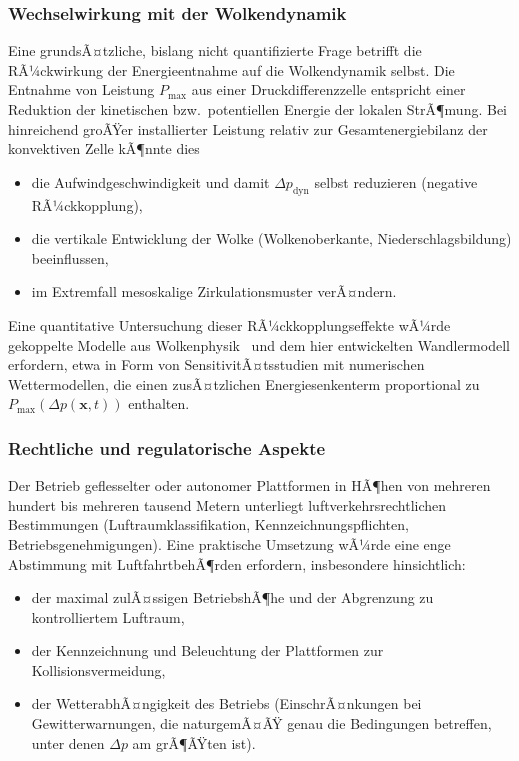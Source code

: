 ﻿\documentclass[a4paper,12pt]{article}
\theoremstyle{definition}
\begin{document}
\subsubsection{Wechselwirkung mit der Wolkendynamik}

Eine grundsÃ¤tzliche, bislang nicht quantifizierte Frage betrifft die
RÃ¼ckwirkung der Energieentnahme auf die Wolkendynamik selbst. Die
Entnahme von Leistung $P_{\max}$ aus einer Druckdifferenzzelle entspricht
einer Reduktion der kinetischen bzw.\ potentiellen Energie der lokalen
StrÃ¶mung. Bei hinreichend groÃŸer installierter Leistung relativ zur
Gesamtenergiebilanz der konvektiven Zelle kÃ¶nnte dies
\begin{itemize}
	\item die Aufwindgeschwindigkeit und damit $\Delta p_{\mathrm{dyn}}$
	selbst reduzieren (negative RÃ¼ckkopplung),
	\item die vertikale Entwicklung der Wolke (Wolkenoberkante,
	Niederschlagsbildung) beeinflussen,
	\item im Extremfall mesoskalige Zirkulationsmuster verÃ¤ndern.
\end{itemize}
Eine quantitative Untersuchung dieser RÃ¼ckkopplungseffekte wÃ¼rde
gekoppelte Modelle aus Wolkenphysik~\cite{houze2014,emanuel1994} und dem
hier entwickelten Wandlermodell erfordern, etwa in Form von
SensitivitÃ¤tsstudien mit numerischen Wettermodellen, die einen zusÃ¤tzlichen
Energiesenkenterm proportional zu $P_{\max}(\Delta p(\mathbf{x},t))$
enthalten.

\subsubsection{Rechtliche und regulatorische Aspekte}

Der Betrieb geflesselter oder autonomer Plattformen in HÃ¶hen von mehreren
hundert bis mehreren tausend Metern unterliegt luftverkehrsrechtlichen
Bestimmungen (Luftraumklassifikation, Kennzeichnungspflichten,
Betriebsgenehmigungen). Eine praktische Umsetzung wÃ¼rde eine enge
Abstimmung mit LuftfahrtbehÃ¶rden erfordern, insbesondere hinsichtlich:
\begin{itemize}
	\item der maximal zulÃ¤ssigen BetriebshÃ¶he und der Abgrenzung zu
	kontrolliertem Luftraum,
	\item der Kennzeichnung und Beleuchtung der Plattformen zur
	Kollisionsvermeidung,
	\item der WetterabhÃ¤ngigkeit des Betriebs (EinschrÃ¤nkungen bei
	Gewitterwarnungen, die naturgemÃ¤ÃŸ genau die Bedingungen betreffen,
	unter denen $\Delta p$ am grÃ¶ÃŸten ist).
\end{itemize}
\end{document}
